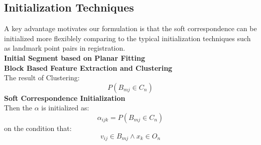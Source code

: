 \subsection{Initialization Techniques}
A key advantage motivates our formulation is that the soft correspondence can be initialized more flexiblely comparing to the typical initialization techniques such as landmark point pairs in registration.\\
\textbf{Initial Segment based on Planar Fitting}\\
\textbf{Block Based Feature Extraction and Clustering}\\
The result of Clustering:
$$P(B_{mj} \in C_n)$$
\textbf{Soft Correspondence Initialization}\\
Then the $\alpha$ is initialized as:
$$\alpha_{ijk}=P(B_{mj} \in C_n)$$
on the condition that:
$$v_{ij} \in B_{mj} \wedge x_k \in O_n$$